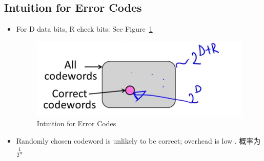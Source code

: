 \documentclass[12pt]{ctexart}   %
\begin{document}
	\subsection{Intuition for Error Codes}
	\begin{itemize}
		\item For D data bits, R check bits: See Figure~\ref{fig:2-8-4}
		\begin{figure}[h!] %
		\centering
		 \includegraphics[scale=0.7]{images/2-8-4}
		\caption{Intuition for Error Codes}
		 \label{fig:2-8-4}
		 \end{figure}
		 
		 \item Randomly chosen codeword is unlikely to be correct; overhead is low . 概率为 $\frac{1}{2^R}$
	\end{itemize}
	
\end{document}
